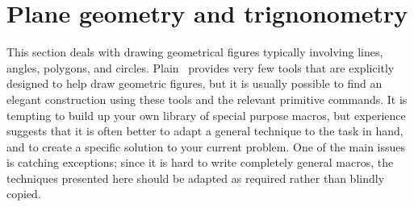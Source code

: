 \documentclass[a4paper,landscape]{article}
\begin{document}
\newpage
\section{Plane geometry and trignonometry}

\noindent{}%
This section deals with drawing geometrical figures typically involving lines,
angles, polygons, and circles.  Plain \MP\ provides very few tools that are
explicitly designed to help draw geometric figures, but it is usually possible to
find an elegant construction using these tools and the relevant primitive commands.
It is tempting to build up your own library of special purpose macros, but
experience suggests that it is often better to adapt a general technique to the task
in hand, and to create a specific solution to your current problem.  One of the main
issues is catching exceptions; since it is hard to write completely general macros,
the techniques presented here should be adapted as required rather than blindly
copied.
\end{document}
